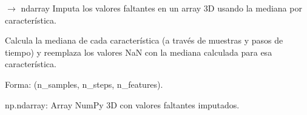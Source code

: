 \documentclass[letterpaper,10pt,english]{sphinxmanual}
\begin{document}
\begin{fulllineitems}
\label{\detokenize{pampaneira_imputation:pampaneira_imputation.imputation_methods.impute_median}}
\pysigstartsignatures
\pysiglinewithargsret
{}
{}
{{ $\rightarrow$ ndarray}}
\pysigstopsignatures
\sphinxAtStartPar
Imputa los valores faltantes en un array 3D usando la mediana por característica.

\sphinxAtStartPar
Calcula la mediana de cada característica (a través de muestras y pasos de tiempo) y
reemplaza los valores NaN con la mediana calculada para esa característica.
\begin{description}
\begin{description}
\sphinxAtStartPar
Forma: (n\_samples, n\_steps, n\_features).

\end{description}

\sphinxAtStartPar
np.ndarray: Array NumPy 3D con valores faltantes imputados.

\end{description}

\end{fulllineitems}

\end{document}
